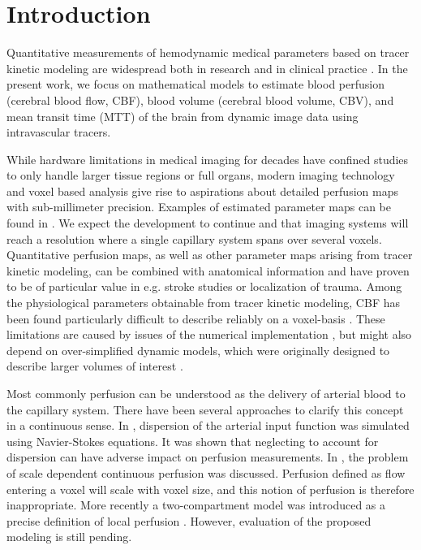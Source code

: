 \documentclass[journal,twocolumn]{IEEEtran}
\begin{document}
	\section{Introduction}
	
	Quantitative measurements of hemodynamic medical parameters based on tracer kinetic modeling are widespread both in research and in clinical practice \cite{sourbron13,Feng2013,Chen2011}. 
	In the present work, we focus on mathematical models to estimate blood perfusion (cerebral blood flow, CBF), blood volume (cerebral blood volume, CBV), and mean transit time (MTT) of the brain from dynamic image data using intravascular tracers. 

	While hardware limitations in medical imaging for decades have confined studies to only handle larger tissue regions or full organs, modern imaging technology and voxel based analysis give rise to aspirations about detailed perfusion maps with sub-millimeter precision. Examples of estimated parameter maps can be found in \cite{Feng2013,Chen2011}. We expect the development to continue and that imaging systems will reach a resolution where a single capillary system spans over several voxels.
	Quantitative perfusion maps, as well as other parameter maps arising from tracer kinetic modeling, can be combined with anatomical information and have proven to be of particular value in e.g. stroke studies or localization of trauma.
	Among the physiological parameters obtainable from tracer kinetic modeling, CBF has been found particularly difficult to describe reliably on a voxel-basis \cite{kudo10}.
	These limitations are caused by issues of the numerical implementation \cite{kudo10}, but might also depend on over-simplified dynamic models, which were originally designed to describe larger volumes of interest \cite{zierler00}.	
	
	Most commonly perfusion can be understood as the delivery of arterial blood to the capillary system.
	There have been several approaches to clarify this concept in a continuous sense.
	In \cite{calamante03}, dispersion of the arterial input function was simulated using Navier-Stokes equations.
	It was shown that neglecting to account for dispersion can have adverse impact on perfusion measurements.
	In \cite{Henkelman1990}, the problem of scale dependent continuous perfusion was discussed. Perfusion defined as flow entering a voxel will scale with voxel size, 
	and this notion of perfusion is therefore inappropriate.	
	More recently a two-compartment model was introduced as a precise definition of local perfusion \cite{sourbron14}.	
	However, evaluation of the proposed modeling is still pending.
	
\end{document}
